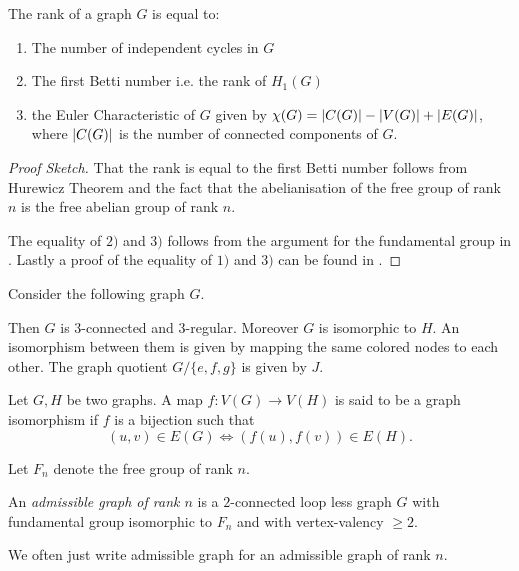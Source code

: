 \begin{proposition}
	The rank of a graph $G$ is equal to:
	\begin{enumerate}
		\item The number of independent cycles in $G$
		\item The first Betti number i.e. the rank of $H_{1}(G)$
		\item the Euler Characteristic of $G$ given by $\chi(G) = \abs{C(G)} - \abs{V(G)} + \abs{E(G)}$, 
			where $\abs{C(G)}$ is the number of connected components of $G$.
	\end{enumerate}
\end{proposition}
\begin{proof}[Proof Sketch]
	That the rank is equal to the first Betti number follows from Hurewicz Theorem and the fact that the abelianisation of the free group of rank $n$
	is the free abelian group of rank  $n$.

	The equality of $2)$ and $3)$ follows from the argument for the fundamental group in \cite[p. 43f]{hatcher00}.
	Lastly a proof of the equality of $1)$ and $3)$ can be found in \cite[p. 37-40]{harary69}.
\end{proof}

\begin{eg}\label{ex:gAuto}
	Consider the following graph $G$.

	Then $G$ is $3$-connected and $3$-regular. Moreover $G$ is isomorphic to $H$.
	An isomorphism between them is given by mapping the same colored nodes to each other.
	The graph quotient $G / \{e,f,g\}$ is given by $J$.

\end{eg}

\begin{definition}
	Let $G,H$ be two graphs. A map $f: V(G) \to V(H)$ is said to be a graph isomorphism if $f$ is a bijection such that
	\[
		(u,v) \in E(G) \Leftrightarrow (f(u),f(v)) \in E(H)
	.\] 
\end{definition}

Let $F_{n}$ denote the free group of rank $n.$
\begin{definition}
	An \emph{admissible graph of rank $n$} is a $2$-connected loop less graph $G$ with fundamental group isomorphic to $F_{n}$ and with vertex-valency $\geq 2$.
\end{definition}

We often just write admissible graph for an admissible graph of rank $n$.


